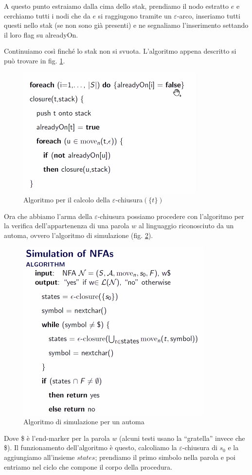 \documentclass[class=book, crop=false, oneside, 12pt]{standalone}
\begin{document}
A questo punto estraiamo dalla cima dello stak, prendiamo il nodo estratto \(e\) e cerchiamo tutti i nodi che da \(e\) si raggiugono tramite un \(\varepsilon\)-arco, inseriamo tutti questi nello stak (se non sono già presenti) e ne segnaliamo l'inserimento settando il loro flag su alreadyOn.

Continuiamo così finché lo stak non si svuota. L'algoritmo appena descritto si può trovare in fig. \ref{algoritmo_epsilon_chiusura}.
\begin{figure}
    \centering
    \includegraphics[width=.6\textwidth,keepaspectratio]{algoritmo_epsilon_chiusura}
    \caption{Algoritmo per il calcolo della \(\varepsilon\)-chiusura\((\{t\})\)}
    \label{algoritmo_epsilon_chiusura}
\end{figure}


Ora che abbiamo l'arma della \(\varepsilon\)-chiusura possiamo procedere con l'algoritmo per la verifica dell'appartenenza di una parola \(w\) al linguaggio riconosciuto da un automa, ovvero l'algoritmo di simulazione (fig. \ref{algoritmo_simulazione_nfa}).
\begin{figure}
    \centering
    \includegraphics[width=.6\textwidth,keepaspectratio]{algoritmo_simulazione_nfa}
    \caption{Algoritmo di simulazione per un automa}
    \label{algoritmo_simulazione_nfa}
\end{figure}
Dove \$ è l’end-marker per la parola \(w\) (alcuni testi usano la “gratella” invece che \$).
Il funzionamento dell'algoritmo è questo, calcoliamo la \(\varepsilon\)-chiusura di \(s_0\) e la aggiungiamo all'insieme \(states\); prendiamo il primo simbolo nella parola e poi entriamo nel ciclo che compone il corpo della procedura.
\end{document}
